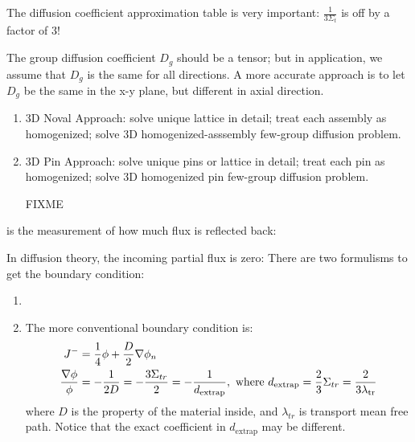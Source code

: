 \documentclass{school-22.211-notes}
\begin{document}
\clearpage
{}

The diffusion coefficient approximation table is very important: $\frac{1}{3\Sigma_t}$ is off by a factor of 3! 



The group diffusion coefficient $D_g$ should be a tensor; but in application, we assume that $D_g$ is the same for all directions. A more accurate approach is to let $D_g$ be the same in the x-y plane, but different in axial direction. 




\clearpage
{}
\begin{enumerate}
\item 3D Noval Approach: solve unique lattice in detail; treat each assembly as homogenized; solve 3D homogenized-asssembly few-group diffusion problem. 
\item 3D Pin Approach: solve unique pins or lattice in detail; treat each pin as homogenized; solve 3D homogenized pin few-group diffusion problem. 
\item [FIXME]
\end{enumerate}





 is the measurement of how much flux is reflected back: 


In diffusion theory, the incoming partial flux is zero:
There are two formulisms to get the boundary condition: 
\begin{enumerate}
\item 
{}
\item The more conventional boundary condition is: 
\begin{align}
  J^- &= \frac{1}{4} \phi + \frac{D}{2} \nabla \phi_n \\
  \frac{\nabla \phi}{\phi} &= - \frac{1}{2D} = - \frac{3\Sigma_{tr}}{2} = - \frac{1}{d_{\mathrm{extrap}}}, \mbox{ where } d_{\mathrm{extrap}} = \frac{2}{3} \Sigma_{tr}  = \frac{2}{3 \lambda_{\mathrm{tr}}} 
\end{align}
where $D$ is the property of the material inside, and $\lambda_{tr}$ is transport mean free path. Notice that the exact coefficient in $d_{\mathrm{extrap}}$ may be different. 
\end{enumerate}
\end{document}
